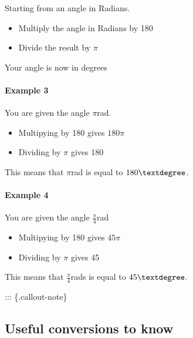 \documentclass[
  12pt,
  a4paper, oneside]{starmastarticle}
\let\oldparagraph\paragraph
\renewcommand{\paragraph}[1]{\oldparagraph{#1}\mbox{}}
\providecommand{\tightlist}{%
  \setlength{\itemsep}{0pt}\setlength{\parskip}{0pt}}\usepackage{longtable,booktabs,array}
\begin{document}
Starting from an angle in Radians.

\begin{itemize}
\tightlist
\item
  Multiply the angle in Radians by 180
\item
  Divide the result by \(\pi\)
\end{itemize}

Your angle is now in degrees

\hypertarget{example-3}{%
\paragraph{Example 3}\label{example-3}}

You are given the angle \(\pi\)rad.

\begin{itemize}
\tightlist
\item
  Multipying by 180 gives \(180\pi\)
\item
  Dividing by \(\pi\) gives 180
\end{itemize}

This means that \(\pi\)rad is equal to \(180\textdegree\).

\hypertarget{example-4}{%
\paragraph{Example 4}\label{example-4}}

You are given the angle \(\frac{\pi}{4}\)rad

\begin{itemize}
\tightlist
\item
  Multipying by 180 gives \(45\pi\)
\item
  Dividing by \(\pi\) gives 45
\end{itemize}

This means that \(\frac{\pi}{4}\)rads is equal to \(45\textdegree\).

::: \{.callout-note\}

\hypertarget{useful-conversions-to-know}{%
\subsection{Useful conversions to
know}\label{useful-conversions-to-know}}
\end{document}
